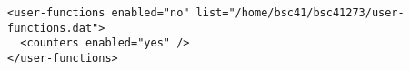 \begin{verbatim}
<user-functions enabled="no" list="/home/bsc41/bsc41273/user-functions.dat">
  <counters enabled="yes" />
</user-functions>
\end{verbatim}

